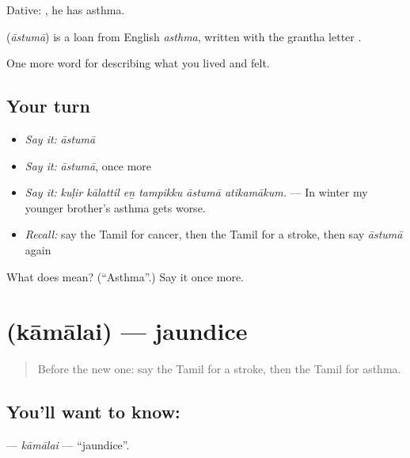 Dative:   , he has asthma.

\begin{cousinweb}
\textbf{} (\emph{āstumā}) is a loan from English \emph{asthma}, written with the grantha letter .
\end{cousinweb}

\begin{grammarlens}[title={What you've built}]
One more word for describing what you lived and felt.
\end{grammarlens}

\subsection*{Your turn}
\begin{itemize}
\raggedright
  \item \emph{Say it:} \emph{āstumā}
  \item \emph{Say it:} \emph{āstumā}, once more
  \item \emph{Say it:} \emph{kuḷir kālattil eṉ tampikku āstumā atikamākum.} — In winter my younger brother’s asthma gets worse.
  \item \emph{Recall:} say the Tamil for cancer, then the Tamil for a stroke, then say \emph{āstumā} again
\end{itemize}

\begin{tcolorbox}[breakable,colback=teal!4,colframe=teal!35!black,title={Before you move on}]
What does  mean? (\textquotedblleft{}Asthma\textquotedblright{}.) Say it once more.
\end{tcolorbox}
\section[\texorpdfstring{\ta{காமாலை} (kāmālai)}{காமாலை (kāmālai)}]{ (kāmālai) — jaundice}

\label{lesson:TA-C477-kamalai}



\begin{quote}
Before the new one: say the Tamil for a stroke, then the Tamil for asthma.
\end{quote}

\subsection*{You'll want to know: }
\textbf{} — \emph{kāmālai} — \textquotedblleft{}jaundice\textquotedblright{}.

